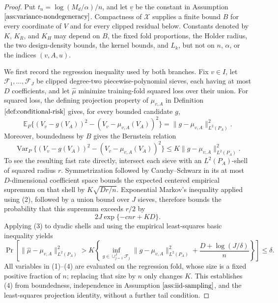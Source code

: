 \documentclass{article}
\begin{document}
\begin{proof}
Put \(t_n=\log(M_d/\alpha)/n\), and let \(\underline v\) be the constant in Assumption \(\ref{ass:variance-nondegeneracy}\). Compactness of \(\mathcal X\) supplies a finite bound \(B\) for every coordinate of \(V\) and for every clipped residual below. Constants denoted by \(K\), \(K_R\), and \(K_H\) may depend on \(B\), the fixed fold proportions, the Holder radius, the two design-density bounds, the kernel bounds, and \(L_k\), but not on \(n\), \(\alpha\), or the indices \((v,A,u)\).

We first record the regression inequality used by both branches. Fix \(v\in I\), let \(\mathcal F_1,\ldots,\mathcal F_J\) be clipped degree-two piecewise-polynomial sieves, each having at most \(D\) coefficients, and let \(\widehat\mu\) minimize training-fold squared loss over their union. For squared loss, the defining projection property of \(\mu_{v,A}\) in Definition \(\ref{def:conditional-risk}\) gives, for every bounded candidate \(g\),
\[
 \mathbb E_P\{(V_v-g(V_A))^2-(V_v-\mu_{v,A}(V_A))^2\}
 =\lVert g-\mu_{v,A}\rVert_{L^2(P_A)}^2. \tag{1}
\]
Moreover, boundedness by \(B\) gives the Bernstein relation
\[
 \operatorname{Var}_P\{(V_v-g(V_A))^2-(V_v-\mu_{v,A}(V_A))^2\}
 \le K\lVert g-\mu_{v,A}\rVert_{L^2(P_A)}^2. \tag{2}
\]
To see the resulting fast rate directly, intersect each sieve with an \(L^2(P_A)\)-shell of squared radius \(r\). Symmetrization followed by Cauchy--Schwarz in its at most \(D\)-dimensional coefficient space bounds the expected centered empirical supremum on that shell by \(K\sqrt{Dr/n}\). Exponential Markov's inequality applied using (2), followed by a union bound over \(J\) sieves, therefore bounds the probability that this supremum exceeds \(r/2\) by
\[
 2J\exp\{-c n r+K D\}. \tag{3}
\]
Applying (3) to dyadic shells and using the empirical least-squares basic inequality yields
\[
 \Pr\!\left[
 \lVert\widehat\mu-\mu_{v,A}\rVert_{L^2(P_A)}^2
 >K\left\{
 \inf_{g\in\cup_{j=1}^J\mathcal F_j}
 \lVert g-\mu_{v,A}\rVert_{L^2(P_A)}^2
 +\frac{D+\log(J/\delta)}{n}
 \right\}
 \right]\le\delta . \tag{4}
\]
All variables in (1)--(4) are evaluated on the regression fold, whose size is a fixed positive fraction of \(n\); replacing that size by \(n\) only changes \(K\). This establishes (4) from boundedness, independence in Assumption \(\ref{ass:iid-sampling}\), and the least-squares projection identity, without a further tail condition.


\end{proof}
\end{document}
